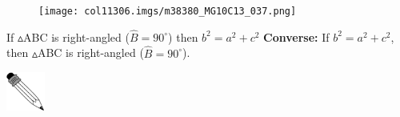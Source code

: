 \begin{table}[H]
\begin{figure}[H]
\begin{center}
\label{m38380*id318334!!!underscore!!!media}\label{
m38380*id318334!!!underscore!!!printimage}\texttt{[image: col11306.imgs/m38380\_MG10C13\_037.png]} %
        
      \vspace{2pt}
    \vspace{.1in}
    
    \end{center}

 \end{figure}   

    \addtocounter{footnote}{-0}
    



If \begin{math}▵\end{math}ABC is right-angled (\begin{math}\hat{B}={90}^{\circ
}\end{math}) then
\begin{math}{b}^{2}={a}^{2}+{c}^{2}\end{math}\newline
    \textbf{Converse:}
If \begin{math}{b}^{2}={a}^{2}+{c}^{2}\end{math}, then
\begin{math}▵\end{math}ABC is right-angled (\begin{math}\hat{B}={90}^{\circ
}\end{math}).

\vspace{\rubberspace}\par 
\label{m38380*eip-693}\vspace{.5cm} 
      
      \noindent
      \hspace*{-30pt}\includegraphics[width=0.5in]{col11306.imgs/pspencil2.png} 
\end{table}
